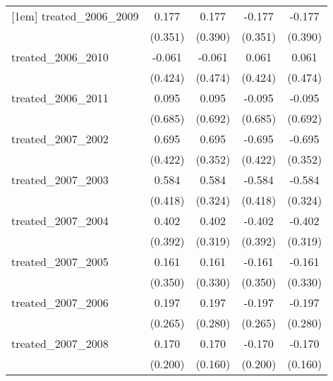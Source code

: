 {\begin{tabular}{l*{4}{c}}
[1em]
treated\_2006\_2009&       0.177         &       0.177         &      -0.177         &      -0.177         \\
            &     (0.351)         &     (0.390)         &     (0.351)         &     (0.390)         \\
[1em]
treated\_2006\_2010&      -0.061         &      -0.061         &       0.061         &       0.061         \\
            &     (0.424)         &     (0.474)         &     (0.424)         &     (0.474)         \\
[1em]
treated\_2006\_2011&       0.095         &       0.095         &      -0.095         &      -0.095         \\
            &     (0.685)         &     (0.692)         &     (0.685)         &     (0.692)         \\
[1em]
treated\_2007\_2002&       0.695         &       0.695\sym{*}  &      -0.695         &      -0.695\sym{*}  \\
            &     (0.422)         &     (0.352)         &     (0.422)         &     (0.352)         \\
[1em]
treated\_2007\_2003&       0.584         &       0.584         &      -0.584         &      -0.584         \\
            &     (0.418)         &     (0.324)         &     (0.418)         &     (0.324)         \\
[1em]
treated\_2007\_2004&       0.402         &       0.402         &      -0.402         &      -0.402         \\
            &     (0.392)         &     (0.319)         &     (0.392)         &     (0.319)         \\
[1em]
treated\_2007\_2005&       0.161         &       0.161         &      -0.161         &      -0.161         \\
            &     (0.350)         &     (0.330)         &     (0.350)         &     (0.330)         \\
[1em]
treated\_2007\_2006&       0.197         &       0.197         &      -0.197         &      -0.197         \\
            &     (0.265)         &     (0.280)         &     (0.265)         &     (0.280)         \\
[1em]
treated\_2007\_2008&       0.170         &       0.170         &      -0.170         &      -0.170         \\
            &     (0.200)         &     (0.160)         &     (0.200)         &     (0.160)         \\

\end{tabular}}
